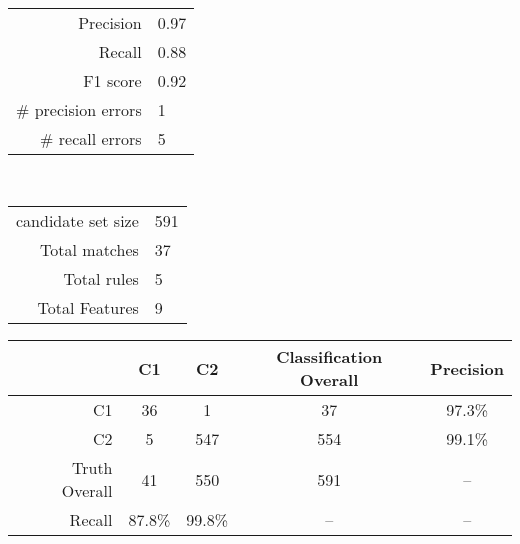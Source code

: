 \documentclass[dvips,11pt]{article}
\begin{document}
\vspace{.3in}
\parbox[t]{.45\linewidth}{
\\[3pt]
\begin{tabular}{rl}
 Precision & 0.97\\
 Recall & 0.88\\
 F1 score & 0.92\\
 \# precision errors & 1\\
 \# recall errors & 5\\
\end{tabular}
}
\hfill
\parbox[t]{0.45\linewidth}{
\\[3pt]
\begin{tabular}{rl}
candidate set size & 591\\
Total matches & 37\\
Total rules & 5\\
Total Features & 9
\end{tabular}
}
\begin{table}
  \small
  \begin{tabular}{|r|c|c|c|c|}
    \hline
    & C1 & C2 & Classification Overall & Precision \\\hline
    C1 & 36 & 1 & 37 & 97.3\%\\
    C2 & 5  & 547 & 554 & 99.1\%\\\hline
    Truth Overall & 41 & 550 & 591 & --\\
    Recall & 87.8\% & 99.8\% & -- & -- \\\hline
  \end{tabular}
\end{table}

\end{document}
